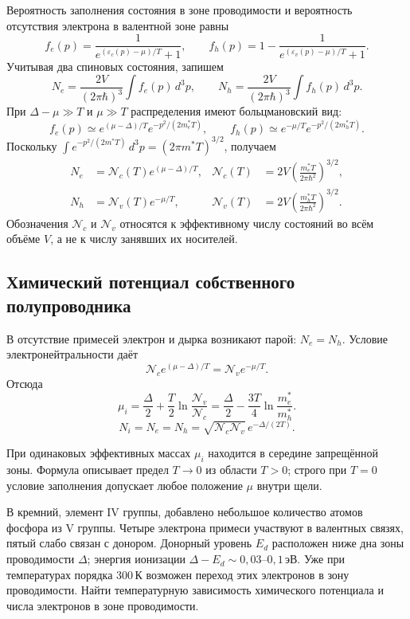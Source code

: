 \documentclass[../final.tex]{subfiles}
\begin{document}
Вероятность заполнения состояния в зоне проводимости и вероятность
отсутствия электрона в валентной зоне равны
\[
f_e(p)=\frac{1}{e^{(\varepsilon_c(p)-\mu)/T}+1},\qquad
    f_h(p)=1-\frac{1}{e^{(\varepsilon_v(p)-\mu)/T}+1}.
\]
Учитывая два спиновых состояния, запишем
\[
N_e=\frac{2V}{(2\pi\hbar)^3}\int f_e(p)\,d^3p,\qquad
    N_h=\frac{2V}{(2\pi\hbar)^3}\int f_h(p)\,d^3p.
\]
При $\Delta-\mu\gg T$ и $\mu\gg T$ распределения имеют
больцмановский вид:
\[
f_e(p)\simeq e^{(\mu-\Delta)/T}e^{-p^2/(2m_e^*T)},\qquad
    f_h(p)\simeq e^{-\mu/T}e^{-p^2/(2m_h^*T)}.
\]
Поскольку
$\int e^{-p^2/(2m^*T)}\,d^3p=(2\pi m^*T)^{3/2}$, получаем
\begin{align*}
    N_e&=\mathcal N_c(T)e^{(\mu-\Delta)/T},&
    \mathcal N_c(T)&=2V\left(\frac{m_e^*T}{2\pi\hbar^2}\right)^{3/2},\\
    N_h&=\mathcal N_v(T)e^{-\mu/T},&
    \mathcal N_v(T)&=2V\left(\frac{m_h^*T}{2\pi\hbar^2}\right)^{3/2}.
\end{align*}
Обозначения $\mathcal N_c$ и $\mathcal N_v$ относятся к эффективному
числу состояний во всём объёме $V$, а не к числу занявших их носителей.

\subsection*{Химический потенциал собственного полупроводника}

В отсутствие примесей электрон и дырка возникают парой: $N_e=N_h$.
Условие электронейтральности даёт
\[
\mathcal N_c e^{(\mu-\Delta)/T}
    =\mathcal N_v e^{-\mu/T}.
\]
Отсюда
\[
\mu_i=\frac\Delta2+\frac T2\ln\frac{\mathcal N_v}{\mathcal N_c}
    =\frac\Delta2-\frac{3T}{4}\ln\frac{m_e^*}{m_h^*}.
\]
\[
N_i=N_e=N_h
    =\sqrt{\mathcal N_c\mathcal N_v}\,e^{-\Delta/(2T)}.
\]

При одинаковых эффективных массах $\mu_i$ находится в середине
запрещённой зоны. Формула описывает предел $T\to0$ из области $T>0$;
строго при $T=0$ условие заполнения допускает любое положение $\mu$
внутри щели.

\clearpage
{}

\condition
В кремний, элемент IV группы, добавлено небольшое количество атомов
фосфора из V группы. Четыре электрона примеси участвуют в валентных
связях, пятый слабо связан с донором. Донорный уровень $E_d$ расположен
ниже дна зоны проводимости $\Delta$; энергия ионизации
$\Delta-E_d\sim0{,}03$--$0{,}1\,\text{эВ}$. Уже при температурах порядка
$300\,\text{К}$ возможен переход этих электронов в зону проводимости.
Найти температурную зависимость химического потенциала и числа
электронов в зоне проводимости.
\end{document}
